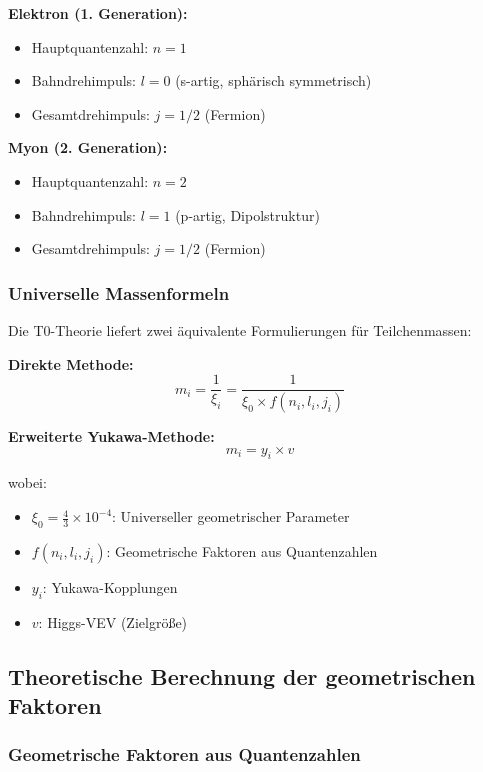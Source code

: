 \textbf{Elektron (1. Generation):}
\begin{itemize}
	\item Hauptquantenzahl: $n = 1$
	\item Bahndrehimpuls: $l = 0$ (s-artig, sphärisch symmetrisch)
	\item Gesamtdrehimpuls: $j = 1/2$ (Fermion)
\end{itemize}

\textbf{Myon (2. Generation):}
\begin{itemize}
	\item Hauptquantenzahl: $n = 2$
	\item Bahndrehimpuls: $l = 1$ (p-artig, Dipolstruktur)
	\item Gesamtdrehimpuls: $j = 1/2$ (Fermion)
\end{itemize}

\subsubsection{Universelle Massenformeln}

Die T0-Theorie liefert zwei äquivalente Formulierungen für Teilchenmassen:

\textbf{Direkte Methode:}
\begin{equation}
	m_i = \frac{1}{\xi_i} = \frac{1}{\xi_0 \times f(n_i, l_i, j_i)}
	\label{eq:direct_mass_formula}
\end{equation}

\textbf{Erweiterte Yukawa-Methode:}
\begin{equation}
	m_i = y_i \times v
	\label{eq:yukawa_mass_formula}
\end{equation}

wobei:
\begin{itemize}
	\item $\xi_0 = \frac{4}{3} \times 10^{-4}$: Universeller geometrischer Parameter
	\item $f(n_i, l_i, j_i)$: Geometrische Faktoren aus Quantenzahlen
	\item $y_i$: Yukawa-Kopplungen
	\item $v$: Higgs-VEV (Zielgröße)
\end{itemize}

\subsection{Theoretische Berechnung der geometrischen Faktoren}

\subsubsection{Geometrische Faktoren aus Quantenzahlen}

